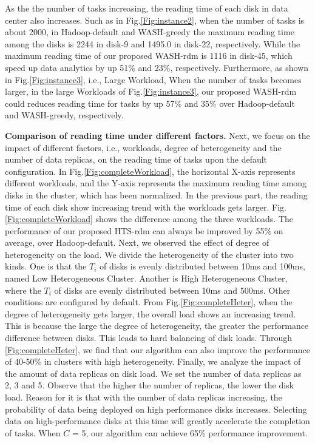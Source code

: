 \documentclass[conference]{IEEEtran}
\begin{document}
As the the number of tasks increasing, the reading time of each disk in data center also increases. Such as in Fig.\ref{Fig:instance2}, when the number of tasks is about 2000, in Hadoop-default and WASH-greedy the maximum reading time among the disks is 2244 in disk-9 and 1495.0 in disk-22, respectively. While the maximum reading time of our proposed WASH-rdm is 1116 in disk-45, which speed up data analytics by up 51\% and 23\%, respectively. 
Furthermore, as shown in Fig.\ref{Fig:instance3}, i.e., Large Workload,  When the number of tasks becomes larger, in the large Workloads of Fig.\ref{Fig:instance3}, our proposed WASH-rdm could reduces reading time for tasks by up 57\% and 35\% over Hadoop-default and WASH-greedy, respectively. 



\textbf{Comparison of reading time under different factors.} Next, we focus on the impact of different factors, i.e., workloads, degree of heterogeneity and the number of data replicas, on the reading time of tasks upon the default configuration. In Fig.\ref{Fig:completeWorkload}, the horizontal X-axis represents different workloads, and the Y-axis represents the maximum reading time among disks in the cluster, which has been normalized. In the previous part, the reading time of each disk show increasing trend with the workloads gets larger. 
Fig.\ref{Fig:completeWorkload} shows the difference among the three workloads. The performance of our proposed HTS-rdm can always be improved by 55\% on average, over Hadoop-default. Next, we observed the effect of degree of heterogeneity on the load. We divide the heterogeneity of the cluster into two kinds. One is that the $T_i$ of disks is evenly distributed between 10ms and 100ms, named Low Heterogeneous Cluster. Another is High Heterogeneous Cluster, where the $T_i$ of disks are evenly distributed between 10ms and 500ms. Other conditions are configured by default. From Fig.\ref{Fig:completeHeter}, when the degree of heterogeneity gets larger, the overall load shows an increasing trend. This is because the large the degree of heterogeneity, the greater the performance difference between disks. This leads to hard balancing of disk loads. Through \ref{Fig:completeHeter}, we find that our algorithm can also improve the performance of 40-50\% in clusters with high heterogeneity. Finally, we analyze the impact of the amount of data replicas on disk load. We set the number of data replicas as 2, 3 and 5. Observe that the higher the number of replicas, the lower the disk load. Reason for it is that with the number of data replicas increasing, the probability of data being deployed on high performance disks increases. Selecting data on high-performance disks at this time will greatly accelerate the completion of tasks. When $C$ = 5, our algorithm can achieve 65\% performance improvement.
 
\end{document}

